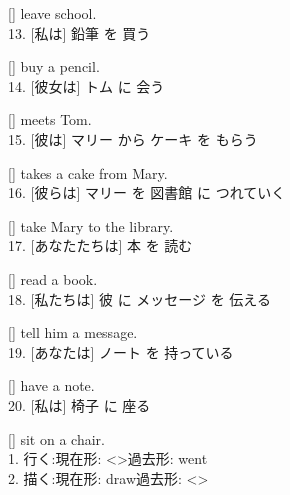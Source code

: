 \documentclass[uplatex,
paper=a4,
fontsize=18pt,
jafontsize=16pt,
number_of_lines=30,
line_length=30zh,
baselineskip=25pt,
]{jlreq}
\begin{document}
  [\hspace{3em}] leave school.
\\

13.  [私は] 鉛筆 を 買う

  [\hspace{3em}] buy a pencil.
\\

14.  [彼女は] トム に 会う

  [\hspace{3em}] meets Tom.
\\

15.  [彼は] マリー から ケーキ を もらう

  [\hspace{3em}] takes a cake from Mary.
\\

16.  [彼らは] マリー を 図書館 に つれていく

  [\hspace{3em}] take Mary to the library.
\\

17.  [あなたたちは] 本 を 読む

  [\hspace{3em}] read a book.
\\

18.  [私たちは] 彼 に メッセージ を 伝える

  [\hspace{3em}] tell him a message.
\\

19.  [あなたは] ノート を 持っている

  [\hspace{3em}] have a note.
\\

20.  [私は] 椅子 に 座る

  [\hspace{3em}] sit on a chair.
\\


\newpage
{}
1.  行く:\hspace{2em}現在形: <\hspace{3em}>\hspace{2em}過去形: went
\\

2.  描く:\hspace{2em}現在形: draw\hspace{2em}過去形: <\hspace{3em}>
\\
\end{document}
